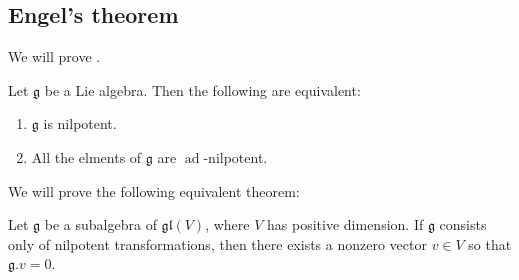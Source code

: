 \documentclass{article}
\DeclareMathOperator{\ad}{ad}
\newcommand*\frkg{{\ensuremath{\mathfrak{g}}}}
\newcommand*\gl{\ensuremath{\mathfrak{gl}}}
\newcommand*\acts{.}
\begin{document}
\subsection{Engel's theorem}

We will prove .

\begin{theorem}[Engel]
    Let $\frkg$ be a Lie algebra.
    Then the following are equivalent:
    \begin{enumerate}[label=(\roman*)]
        \item 
            $\frkg$ is nilpotent.
        \item 
            All the elments of $\frkg$ are $\ad$-nilpotent.
    \end{enumerate}
\end{theorem}

We will prove the following equivalent theorem:

\begin{theorem}
    Let $\frkg$ be a subalgebra of $\gl(V)$, where $V$ has positive dimension.
    If $\frkg$ consists only of nilpotent transformations, then there exists a nonzero vector $v \in V$ so that $\frkg \acts v = 0$.
\end{theorem}
\end{document}

